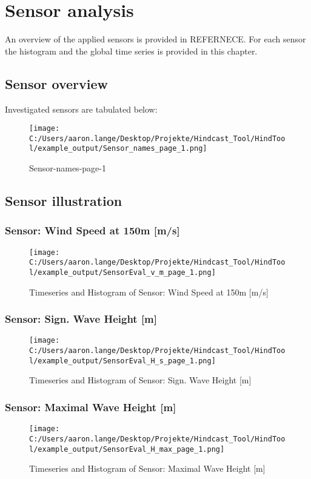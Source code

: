 \section{Sensor analysis}
An overview of the applied sensors is provided in REFERNECE. For each sensor the histogram and the global time series is provided in this chapter.

\subsection{Sensor overview}

Investigated sensors are tabulated below:

\begin{figure}[H] 
 \centering 
 \texttt{[image: C:/Users/aaron.lange/Desktop/Projekte/Hindcast\_Tool/HindTool/example\_output/Sensor\_names\_page\_1.png]} 
 \captionsetup{type=table} 
\caption{ Sensor-names-page-1 } 
 \label{tab: Sensor_names_page_1 } 
\end{figure}

\clearpage 

\subsection{Sensor illustration}

\subsubsection{Sensor: Wind Speed at 150m [m/s]} 
\begin{figure}[H] 
 \centering 
 \texttt{[image: C:/Users/aaron.lange/Desktop/Projekte/Hindcast\_Tool/HindTool/example\_output/SensorEval\_v\_m\_page\_1.png]} 
 \caption{ Timeseries and Histogram of Sensor: Wind Speed at 150m [m/s] } 
 \label{fig: SensorEval_v_m_page_1 } 
\end{figure}
 \clearpage
\subsubsection{Sensor: Sign. Wave Height [m]} 
\begin{figure}[H] 
 \centering 
 \texttt{[image: C:/Users/aaron.lange/Desktop/Projekte/Hindcast\_Tool/HindTool/example\_output/SensorEval\_H\_s\_page\_1.png]} 
 \caption{ Timeseries and Histogram of Sensor: Sign. Wave Height [m] } 
 \label{fig: SensorEval_H_s_page_1 } 
\end{figure}
 \clearpage
\subsubsection{Sensor: Maximal Wave Height [m]} 
\begin{figure}[H] 
 \centering 
 \texttt{[image: C:/Users/aaron.lange/Desktop/Projekte/Hindcast\_Tool/HindTool/example\_output/SensorEval\_H\_max\_page\_1.png]} 
 \caption{ Timeseries and Histogram of Sensor: Maximal Wave Height [m] } 
 \label{fig: SensorEval_H_max_page_1 } 
\end{figure}
 \clearpage
